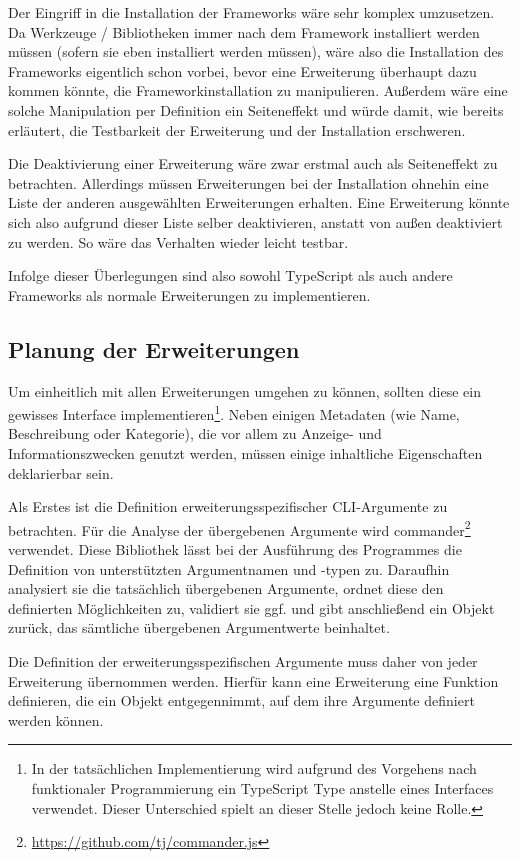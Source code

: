 Der Eingriff in die Installation der Frameworks wäre sehr komplex umzusetzen. Da Werkzeuge / Bibliotheken immer nach dem Framework installiert werden müssen (sofern sie eben installiert werden müssen), wäre also die Installation des Frameworks eigentlich schon vorbei, bevor eine Erweiterung überhaupt dazu kommen könnte, die Frameworkinstallation zu manipulieren. Außerdem wäre eine solche Manipulation per Definition ein Seiteneffekt und würde damit, wie bereits erläutert, die Testbarkeit der Erweiterung und der Installation erschweren.

Die Deaktivierung einer Erweiterung wäre zwar erstmal auch als Seiteneffekt zu betrachten. Allerdings müssen Erweiterungen bei der Installation ohnehin eine Liste der anderen ausgewählten Erweiterungen erhalten. Eine Erweiterung könnte sich also aufgrund dieser Liste selber deaktivieren, anstatt von außen deaktiviert zu werden. So wäre das Verhalten wieder leicht testbar.

Infolge dieser Überlegungen sind also sowohl TypeScript als auch andere Frameworks als normale Erweiterungen zu implementieren.

\subsection{Planung der Erweiterungen}
Um einheitlich mit allen Erweiterungen umgehen zu können, sollten diese ein gewisses Interface implementieren\footnote{In der tatsächlichen Implementierung wird aufgrund des Vorgehens nach funktionaler Programmierung ein TypeScript Type anstelle eines Interfaces verwendet. Dieser Unterschied spielt an dieser Stelle jedoch keine Rolle.}. Neben einigen Metadaten (wie Name, Beschreibung oder Kategorie), die vor allem zu Anzeige- und Informationszwecken genutzt werden, müssen einige inhaltliche Eigenschaften deklarierbar sein.

Als Erstes ist die Definition erweiterungsspezifischer \gls{CLI}-Argumente zu betrachten. Für die Analyse der übergebenen Argumente wird commander\footnote{\url{https://github.com/tj/commander.js}} verwendet. Diese Bibliothek lässt bei der Ausführung des Programmes die Definition von unterstützten Argumentnamen und -typen zu. Daraufhin analysiert sie die tatsächlich übergebenen Argumente, ordnet diese den definierten Möglichkeiten zu, validiert sie ggf. und gibt anschließend ein Objekt zurück, das sämtliche übergebenen Argumentwerte beinhaltet.

Die Definition der erweiterungsspezifischen Argumente muss daher von jeder Erweiterung übernommen werden. Hierfür kann eine Erweiterung eine Funktion definieren, die ein Objekt entgegennimmt, auf dem ihre Argumente definiert werden können.

